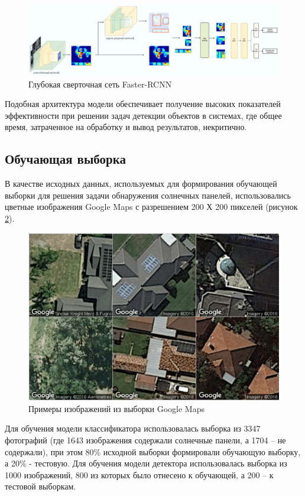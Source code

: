 \begin{figure}[ht]
	\centering
	\includegraphics[width=17cm]{man-source/images/ch4/pic4-21.jpg}
	\caption{Глубокая сверточная сеть Faster-RCNN}
	\label{fig:faster_rcnn}
\end{figure}

Подобная архитектура модели обеспечивает получение высоких показателей эффективности при решении задач детекции объектов в системах, где общее время, затраченное на обработку и вывод результатов, некритично.

\subsection{Обучающая выборка}
В качестве исходных данных, используемых для формирования обучающей выборки для решения задачи обнаружения солнечных панелей, использовались цветные изображения Google Maps с разрешением 200 Х 200 пикселей (рисунок \ref{fig:google_maps}).

\begin{figure}[ht]
	\centering
	\includegraphics[width=12cm]{man-source/images/ch4/pic4-17.png}
	\caption{Примеры изображений из выборки Google Maps}
	\label{fig:google_maps}
\end{figure}

Для обучения модели классификатора использовалась выборка из 3347 фотографий (где 1643 изображения содержали солнечные панели, а 1704 -- не содержали), при этом 80\% исходной выборки формировали обучающую выборку, а 20\% - тестовую. Для обучения модели детектора использовалась выборка из 1000 изображений, 800 из которых было отнесено к обучающей, а 200 -- к тестовой выборкам.

